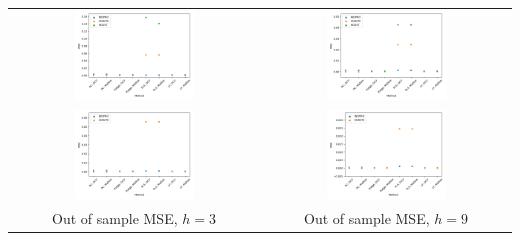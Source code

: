 \begin{table}[]
    \centering
    \begin{tabular}{c c}
        \includegraphics[width=0.5\textwidth]{figures/MSE_oos_h3.png} & \includegraphics[width=0.5\textwidth]{figures/MSE_oos_h9.png} \\
        \includegraphics[width=0.5\textwidth]{figures/MSE_oos_h3_noHOUST.png} &
        \includegraphics[width=0.5\textwidth]{figures/MSE_oos_h9_noHOUST.png} \\
        Out of sample MSE, $h = 3$ & Out of sample MSE, $h = 9$
    \end{tabular}
\end{table}


